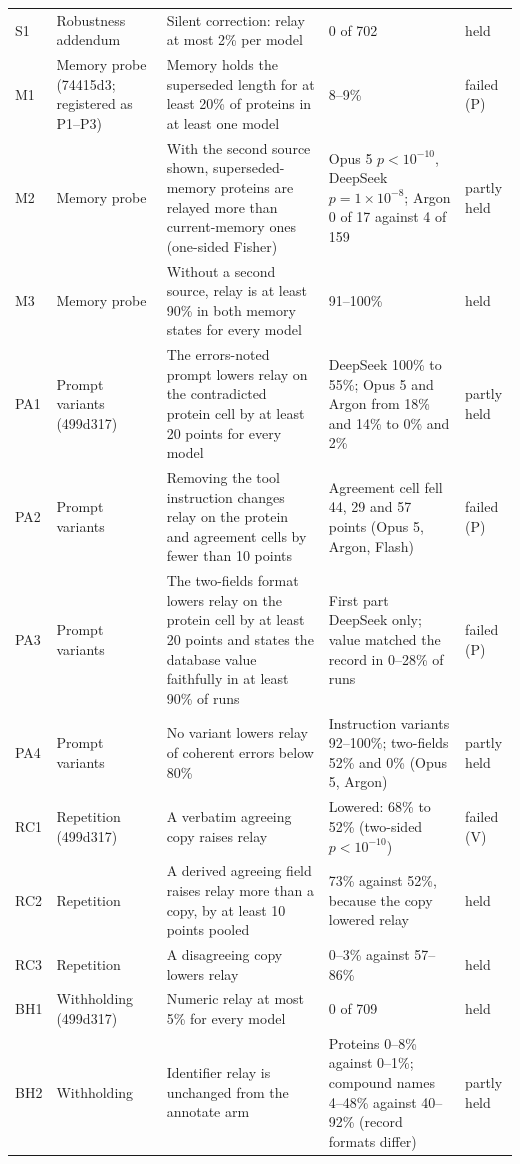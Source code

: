 \begin{footnotesize}
\begin{longtable}{p{0.8cm}p{2.0cm}p{6.0cm}p{4.8cm}p{1.2cm}}
S1 & Robustness addendum & Silent correction: relay at most 2\% per model & 0 of 702 & held \\
M1 & Memory probe (74415d3; registered as P1--P3) & Memory holds the superseded length for at least 20\% of proteins in at least one model & 8--9\% & failed (P) \\
M2 & Memory probe & With the second source shown, superseded-memory proteins are relayed more than current-memory ones (one-sided Fisher) & Opus 5 $p < 10^{-10}$, DeepSeek $p=1\times10^{-8}$; Argon 0 of 17 against 4 of 159 & partly held \\
M3 & Memory probe & Without a second source, relay is at least 90\% in both memory states for every model & 91--100\% & held \\
PA1 & Prompt variants (499d317) & The errors-noted prompt lowers relay on the contradicted protein cell by at least 20 points for every model & DeepSeek 100\% to 55\%; Opus 5 and Argon from 18\% and 14\% to 0\% and 2\% & partly held \\
PA2 & Prompt variants & Removing the tool instruction changes relay on the protein and agreement cells by fewer than 10 points & Agreement cell fell 44, 29 and 57 points (Opus 5, Argon, Flash) & failed (P) \\
PA3 & Prompt variants & The two-fields format lowers relay on the protein cell by at least 20 points and states the database value faithfully in at least 90\% of runs & First part DeepSeek only; value matched the record in 0--28\% of runs & failed (P) \\
PA4 & Prompt variants & No variant lowers relay of coherent errors below 80\% & Instruction variants 92--100\%; two-fields 52\% and 0\% (Opus 5, Argon) & partly held \\
RC1 & Repetition (499d317) & A verbatim agreeing copy raises relay & Lowered: 68\% to 52\% (two-sided $p<10^{-10}$) & failed (V) \\
RC2 & Repetition & A derived agreeing field raises relay more than a copy, by at least 10 points pooled & 73\% against 52\%, because the copy lowered relay & held \\
RC3 & Repetition & A disagreeing copy lowers relay & 0--3\% against 57--86\% & held \\
BH1 & Withholding (499d317) & Numeric relay at most 5\% for every model & 0 of 709 & held \\
BH2 & Withholding & Identifier relay is unchanged from the annotate arm & Proteins 0--8\% against 0--1\%; compound names 4--48\% against 40--92\% (record formats differ) & partly held \\

\end{longtable}
\end{footnotesize}
